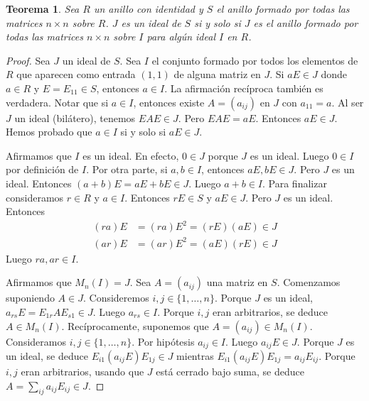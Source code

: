 \documentclass{report}
\newtheorem{theorem}{Teorema}
\begin{document}
  \begin{theorem}
    Sea \(R\) un anillo con identidad y \(S\) el anillo formado por todas las matrices \(n \times n\) sobre \(R\).
    \(J\) es un ideal de \(S\) si y solo si \(J\) es el anillo formado por todas las matrices \(n \times n\) sobre \(I\) para algún ideal \(I\) en \(R\).
  \end{theorem}
  \begin{proof}
    Sea \(J\) un ideal de \(S\).
    Sea \(I\) el conjunto formado por todos los elementos de \(R\) que aparecen como entrada \((1, 1)\) de alguna matriz en \(J\).
    Si \(a E \in J\) donde \(a \in R\) y \(E = E_{1 1} \in S\), entonces \(a \in I\).
    La afirmación recíproca también es verdadera.
    Notar que si \(a \in I\), entonces existe \(A = (a_{i j})\) en \(J\) con \(a_{1 1} = a\).
    Al ser \(J\) un ideal (bilátero), tenemos \(E A E \in J\).
    Pero \(E A E = a E\).
    Entonces \(a E \in J\).
    Hemos probado que \(a \in I\) si y solo si \(a E \in J\).

    Afirmamos que \(I\) es un ideal.
    En efecto, \(0 \in J\) porque \(J\) es un ideal.
    Luego \(0 \in I\) por definición de \(I\).
    Por otra parte, si \(a, b \in I\), entonces \(a E, b E \in J\).
    Pero \(J\) es un ideal.
    Entonces \((a + b) E = a E + b E \in J\).
    Luego \(a + b \in I\).
    Para finalizar consideramos \(r \in R\) y \(a \in I\).
    Entonces \(r E \in S\) y \(a E \in J\).
    Pero \(J\) es un ideal.
    Entonces
    \begin{align}
      (r a) E
      &=
      (r a) E^2
      =
      (r E) (a E)
      \in J
      \\
      (a r) E
      &=
      (a r) E^2
      =
      (a E) (r E)
      \in J
    \end{align}
    Luego \(ra, ar \in I\).

    Afirmamos que \(M_n(I) = J\).
    Sea \(A = (a_{i j})\) una matriz en \(S\).
    Comenzamos suponiendo \(A \in J\).
    Consideremos \(i, j \in \{1, \dots, n\}\).
    Porque \(J\) es un ideal, \(a_{r s} E = E_{1 r} A E_{s 1} \in J\).
    Luego \(a_{r s} \in I\).
    Porque \(i, j\) eran arbitrarios, se deduce \(A \in M_n(I)\).
    Recíprocamente, suponemos que \(A = (a_{i j}) \in M_n(I)\).
    Consideramos \(i, j \in \{1, \dots, n\}\).
    Por hipótesis \(a_{i j} \in I\).
    Luego \(a_{i j} E \in J\).
    Porque \(J\) es un ideal, se deduce \(E_{i 1} (a_{i j} E) E_{1 j} \in J\) mientras \(E_{i 1} (a_{i j} E) E_{1 j} = a_{i j} E_{i j}\).
    Porque \(i, j\) eran arbitrarios, usando que \(J\) está cerrado bajo suma, se deduce \(A = \sum_{i j} a_{i j} E_{i j} \in J\).
  \end{proof}
\end{document}
